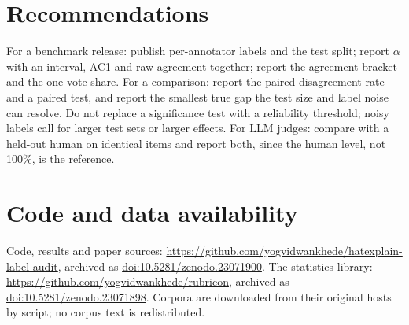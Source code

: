 \documentclass[11pt]{article}
\begin{document}
\section{Recommendations}
For a benchmark release: publish per-annotator labels and the test split; report $\alpha$ with an interval, AC1 and raw agreement together; report the agreement bracket and the one-vote share. For a comparison: report the paired disagreement rate and a paired test, and report the smallest true gap the test size and label noise can resolve. Do not replace a significance test with a reliability threshold; noisy labels call for larger test sets or larger effects. For LLM judges: compare with a held-out human on identical items and report both, since the human level, not 100\%, is the reference.

\ifdefined\PREPRINT
\section*{Code and data availability}
Code, results and paper sources: \url{https://github.com/yogvidwankhede/hatexplain-label-audit}, archived as \href{https://doi.org/10.5281/zenodo.23071900}{doi:10.5281/zenodo.23071900}. The statistics library: \url{https://github.com/yogvidwankhede/rubricon}, archived as \href{https://doi.org/10.5281/zenodo.23071898}{doi:10.5281/zenodo.23071898}. Corpora are downloaded from their original hosts by script; no corpus text is redistributed.
\fi
\end{document}
